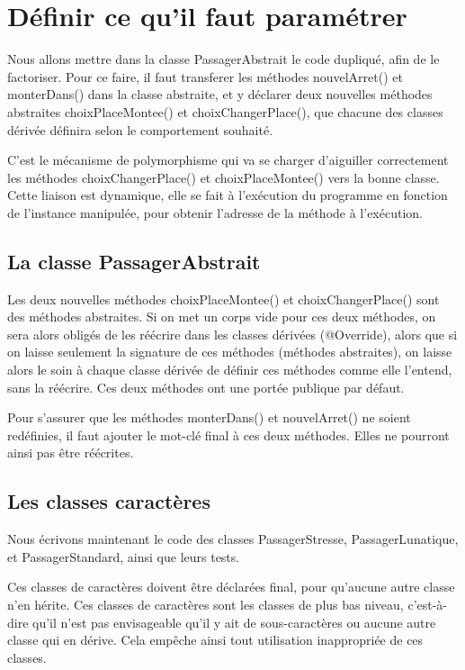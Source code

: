 \documentclass[a4paper,11pt]{article}
\begin{document}
\section{Définir ce qu'il faut paramétrer}
Nous allons mettre dans la classe PassagerAbstrait le code dupliqué, afin de le factoriser. Pour ce faire, il faut transferer les méthodes nouvelArret() et monterDans() dans la classe abstraite, et y déclarer deux nouvelles méthodes abstraites choixPlaceMontee() et choixChangerPlace(), que chacune des classes dérivée définira selon le comportement souhaité.

C'est le mécanisme de polymorphisme qui va se charger d'aiguiller correctement les méthodes choixChangerPlace() et choixPlaceMontee() vers la bonne classe. Cette liaison est dynamique, elle se fait à l'exécution du programme en fonction de l'instance manipulée, pour obtenir l'adresse de la méthode à l'exécution.

\subsection{La classe PassagerAbstrait}
Les deux nouvelles méthodes choixPlaceMontee() et choixChangerPlace() sont des méthodes abstraites.
Si on met un corps vide pour ces deux méthodes, on sera alors obligés de les réécrire dans les classes dérivées (@Override), alors que si on laisse seulement la signature de ces méthodes (méthodes abstraites), on laisse alors le soin à chaque classe dérivée de définir ces méthodes comme elle l'entend, sans la réécrire.
Ces deux méthodes ont une portée publique par défaut.

Pour s'assurer que les méthodes monterDans() et nouvelArret() ne soient redéfinies, il faut ajouter le mot-clé final à ces deux méthodes. Elles ne pourront ainsi pas être réécrites.

\subsection{Les classes caractères}
Nous écrivons maintenant le code des classes PassagerStresse, PassagerLunatique, et PassagerStandard, ainsi que leurs tests.

Ces classes de caractères doivent être déclarées final, pour qu'aucune autre classe n'en hérite. Ces classes de caractères sont les classes de plus bas niveau, c'est-à-dire qu'il n'est pas envisageable qu'il y ait de sous-caractères ou aucune autre classe qui en dérive. Cela empêche ainsi tout utilisation inappropriée de ces classes.
\end{document}
